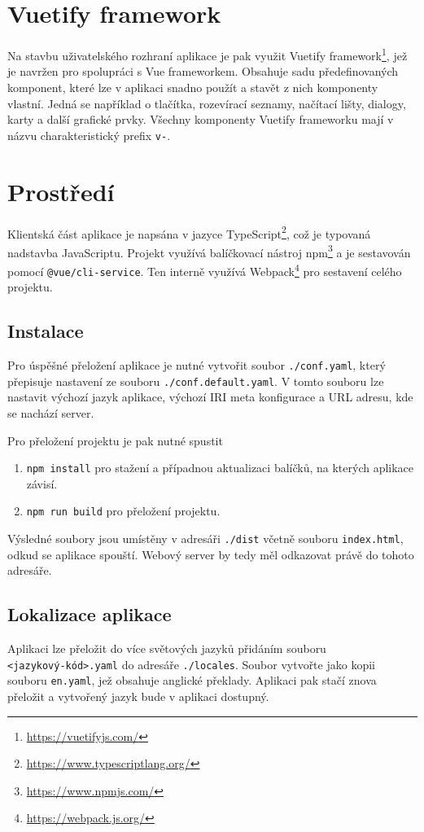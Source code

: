 \newpage

\section{Vuetify framework}
Na stavbu uživatelského rozhraní aplikace je pak využit Vuetify framework\footnote{\url{https://vuetifyjs.com/}}, jež je navržen pro spolupráci s Vue frameworkem. Obsahuje sadu předefinovaných komponent, které lze v aplikaci snadno použít a stavět z nich komponenty vlastní. Jedná se například o tlačítka, rozevírací seznamy, načítací lišty, dialogy, karty a další grafické prvky. Všechny komponenty Vuetify frameworku mají v názvu charakteristický prefix \texttt{v-}.

\section{Prostředí}
Klientská část aplikace je napsána v jazyce TypeScript\footnote{\url{https://www.typescriptlang.org/}}, což je typovaná nadstavba JavaScriptu. Projekt využívá balíčkovací nástroj npm\footnote{\url{https://www.npmjs.com/}} a je sestavován pomocí \texttt{@vue/cli-service}. Ten interně využívá Webpack\footnote{\url{https://webpack.js.org/}} pro sestavení celého projektu.

\subsection{Instalace}
Pro úspěšné přeložení aplikace je nutné vytvořit soubor \texttt{./conf.yaml}, který přepisuje nastavení ze souboru \texttt{./conf.default.yaml}. V tomto souboru lze nastavit výchozí jazyk aplikace, výchozí IRI meta konfigurace a URL adresu, kde se nachází server.

Pro přeložení projektu je pak nutné spustit
\begin{enumerate}
  \item \texttt{npm install} pro stažení a případnou aktualizaci balíčků, na kterých aplikace závisí.
  \item \texttt{npm run build} pro přeložení projektu.
\end{enumerate}

Výsledné soubory jsou umístěny v adresáři \texttt{./dist} včetně souboru \texttt{index.html}, odkud se aplikace spouští. Webový server by tedy měl odkazovat právě do tohoto adresáře.

\subsection*{Lokalizace aplikace}
Aplikaci lze přeložit do více světových jazyků přidáním souboru \\\texttt{<jazykový-kód>.yaml} do adresáře \texttt{./locales}. Soubor vytvořte jako kopii souboru \texttt{en.yaml}, jež obsahuje anglické překlady. Aplikaci pak stačí znova přeložit a vytvořený jazyk bude v aplikaci dostupný.

